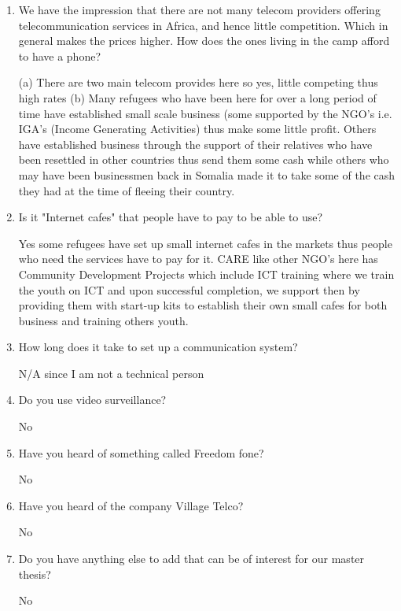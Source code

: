 \begin{enumerate}
\item We have the impression that there are not many telecom providers offering telecommunication services in Africa, and hence little competition. Which in general makes the prices higher. How does the ones living in the camp afford to have a phone? 

(a) There are two main telecom provides here so yes, little competing thus high rates (b) Many refugees who have been here for over a long period of time have established small scale business (some supported by the NGO’s i.e. IGA’s (Income Generating Activities) thus make some little profit.  Others have established business through the support of their relatives who have been resettled in other countries thus send them some cash while others who may have been businessmen back in Somalia made it to take some of the cash they had at the time of fleeing their country.

\item  Is it "Internet cafes" that people have to pay to be able to use?

Yes some refugees have set up small internet cafes in the markets thus people who need the services have to pay for it.  CARE like other NGO’s here has Community Development Projects which include ICT training where we train the youth on ICT and upon successful completion, we support then by providing them with start-up kits to establish their own small cafes for both business and training others youth.

\item How long does it take to set up a communication system?

N/A since I am not a technical person


\item Do you use video surveillance?

No

\item Have you heard of something called Freedom fone?

No

\item Have you heard of the company Village Telco?

No


\item Do you have anything else to add that can be of interest for our master thesis?

No

\end{enumerate}
